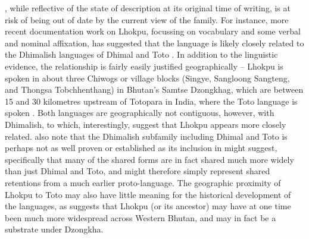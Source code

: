 , while reflective of the state of description at its original time of writing, is at risk of being out of date by the current view of the family. For instance, more recent documentation work on Lhokpu, focussing on vocabulary and some verbal and nominal affixation, has suggested that the language is likely closely related to the Dhimalish languages of Dhimal and Toto \cite{Grollmann2018}. In addition to the linguistic evidence, the relationship is fairly easily justified geographically -- Lhokpu is spoken in about three Chiwogs or village blocks (Singye, Sangloong Sangteng, and Thongsa Tobchhenthang) in Bhutan's Samtse Dzongkhag, which are between 15 and 30 kilometres upstream of Totopara in India, where the Toto language is spoken \cite{Basumatary2016}. Both languages are geographically not contiguous, however, with Dhimalish, to which, interestingly,  suggest that Lhokpu appears more closely related.  also note that the Dhimalish subfamily including Dhimal and Toto is perhaps not as well proven or established as its inclusion in  might suggest, specifically that many of the shared forms are in fact shared much more widely than just Dhimal and Toto, and might therefore simply represent shared retentions from a much earlier proto-language. The geographic proximity of Lhokpu to Toto may also have little meaning for the historical development of the languages, as  suggests that Lhokpu (or its ancestor) may have at one time been much more widespread across Western Bhutan, and may in fact be a substrate under Dzongkha.

